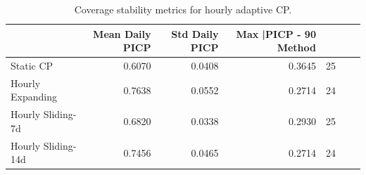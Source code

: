 \begin{table}
\caption{Coverage stability metrics for hourly adaptive CP.}
\label{tab:t5b3_hourly_stability}
\begin{tabular}{lrrrr}
\toprule
 & Mean Daily PICP & Std Daily PICP & Max |PICP - 90%
Method &  &  &  &  \\
\midrule
Static CP & 0.6070 & 0.0408 & 0.3645 & 25 \\
Hourly Expanding & 0.7638 & 0.0552 & 0.2714 & 24 \\
Hourly Sliding-7d & 0.6820 & 0.0338 & 0.2930 & 25 \\
Hourly Sliding-14d & 0.7456 & 0.0465 & 0.2714 & 24 \\
\bottomrule
\end{tabular}
\end{table}
